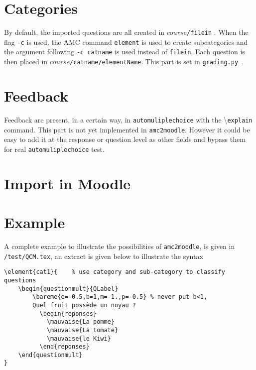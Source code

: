 \documentclass[a4paper]{article}
\newcommand{\py}{\texttt{grading.py}~}
\newcommand{\amc}{\texttt{amc2moodle}}
\begin{document}
 
\section{Categories}
By default, the imported questions are all created in \texttt{$course$/filein}  . When the flag \texttt{-c} is used, the AMC command \texttt{element} is used to create subcategories and the argument following \texttt{-c catname} is used instead of \texttt{filein}.
Each question is then placed in \texttt{$course$/catname/elementName}.
This part is set in \py.

\section{Feedback}\label{sec:feed}
Feedback are present, in a certain way, in \texttt{automuliplechoice} with the \textbackslash\texttt{explain} command. This part is not yet implemented in \amc. However it could be easy to add it at the response or question level as other fields and bypass them for real \texttt{automuliplechoice} test.


\section{Import in Moodle}


\section{Example}
A complete example to illustrate the possibilities of \amc, is given in \texttt{/test/QCM.tex}, an extract is given below to illustrate the syntax 
\begin{verbatim}
\element{cat1}{    % use category and sub-category to classify questions
	\begin{questionmult}{QLabel}  
		\bareme{e=-0.5,b=1,m=-1.,p=-0.5} % never put b<1,
		Quel fruit possède un noyau ?
		  \begin{reponses}    
		    \mauvaise{La pomme}
		    \mauvaise{La tomate}
		    \mauvaise{le Kiwi}
		  \end{reponses}
	\end{questionmult}
}
\end{verbatim}

\end{document}
